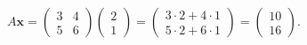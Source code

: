 \documentclass[preview]{standalone}
\begin{document}
\begin{align*}
A\mathbf{x} = \begin{pmatrix} 3 & 4 \\ 5 & 6 \end{pmatrix} \begin{pmatrix} 2 \\ 1 \end{pmatrix}= \begin{pmatrix} 3 \cdot 2 + 4 \cdot 1 \\ 5 \cdot 2 + 6 \cdot 1 \end{pmatrix}= \begin{pmatrix} 10 \\ 16 \end{pmatrix}.
\end{align*}
\end{document}
